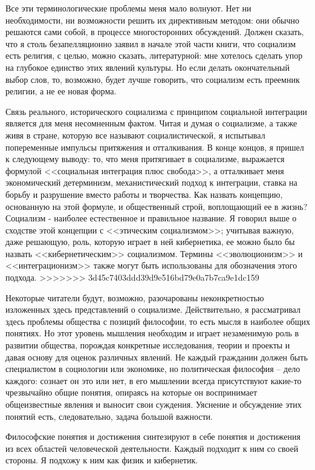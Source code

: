 \documentclass{book}
\begin{document}
Все эти терминологические проблемы меня мало волнуют. Нет ни необходимости, ни возможности решить их директивным методом: они обычно решаются сами собой, в процессе много­сторонних обсуждений. Должен сказать, что я столь безапелля­ционно заявил в начале этой части книги, что социализм есть религия, с целью, можно сказать, литературной: мне хотелось сделать упор на глубокое единство этих явлений культуры. Но если делать окончательный выбор слов, то, возможно, будет лучше говорить, что социализм есть преемник религии, а не ее новая форма.

Связь реального, исторического социализма с принципом социальной интеграции является для меня несомненным фактом. Читая и думая о социализме, а также живя в стране, которую все называют социалистической, я испытывал попеременные импульсы притяжения и отталкивания. В конце концов, я при­шел к следующему выводу: то, что меня притягивает в социализ­ме, выражается формулой <<социальная интеграция плюс свобо­да>>, а отталкивает меня экономический детерминизм, механи­стический подход к интеграции, ставка на борьбу и разрушение вместо работы и творчества. Как назвать концепцию, основан­ную на этой формуле, и общественный строй, воплощающий ее в жизнь? Социализм - наиболее естественное и правильное на­звание. Я говорил выше о сходстве этой концепции с <<этическим социализмом>>; учитывая важную, даже решающую, роль, которую играет в ней кибернетика, ее можно было бы назвать <<кибер­нетическим>> социализмом. Термины <<эволюционизм>> и <<интеграционизм>> также могут быть использованы для обозначения этого подхода.
>>>>>>> 3d45c7403ddd39d9e516bd79e0a7b7ca9e1dc159

Некоторые читатели будут, возможно, разочарованы неконк­ретностью изложенных здесь представлений о социализме. Дейст­вительно, я рассматривал здесь проблемы общества с позиций философии, то есть мысля в наиболее общих понятиях. Но этот уровень мышления необходим и играет незаменимую роль в раз­витии общества, порождая конкретные исследования, теории и проекты и давая основу для оценок различных явлений. Не каж­дый гражданин должен быть специалистом в социологии или экономике, но политическая философия -- дело каждого: со­знает он это или нет, в его мышлении всегда присутствуют какие-то чрезвычайно общие понятия, опираясь на которые он воспри­нимает общеизвестные явления и выносит свои суждения. Уяс­нение и обсуждение этих понятий есть, следовательно, задача большой важности.

Философские понятия и достижения синтезируют в себе поня­тия и достижения из всех областей человеческой деятельности. Каждый подходит к ним со своей стороны. Я подхожу к ним как физик и кибернетик.
\end{document}
